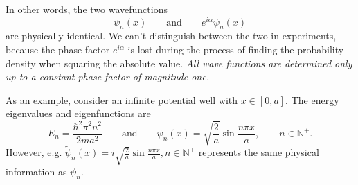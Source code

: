\documentclass[11pt, a4paper]{article}
\newcommand{\eqtext}[1]{\qquad \text{#1} \qquad}
\begin{document}
\begin{itemize}
    In other words, the two wavefunctions
	\begin{equation*}
		\psi_{n}(x) \eqtext{and} e^{i \alpha}\psi_{n}(x)
	\end{equation*}
    are physically identical. We can't distinguish between the two in experiments, because the phase factor $ e^{i \alpha} $ is lost during the process of finding the probability density when squaring the absolute value. \textit{All wave functions are determined only up to a constant phase factor of magnitude one.}
	
    As an example, consider an infinite potential well with $ x \in [0, a] $. The energy eigenvalues and eigenfunctions are
	\begin{equation*}
		E_{n} = \frac{\hbar^{2} \pi^{2} n^{2}}{2ma^{2}} \eqtext{and} \psi_{n}(x) = \sqrt{\frac{2}{a}} \sin \frac{n\pi x}{a}, \qquad n \in \mathbb{N}^{+}.
	\end{equation*}
	However, e.g. $ \tilde{\psi}_{n}(x) = i \sqrt{\frac{2}{a}} \sin \frac{n\pi x}{a}, n \in \mathbb{N}^{+} $ represents the same physical information as $ \psi_{n} $. 
\end{itemize}
\end{document}
